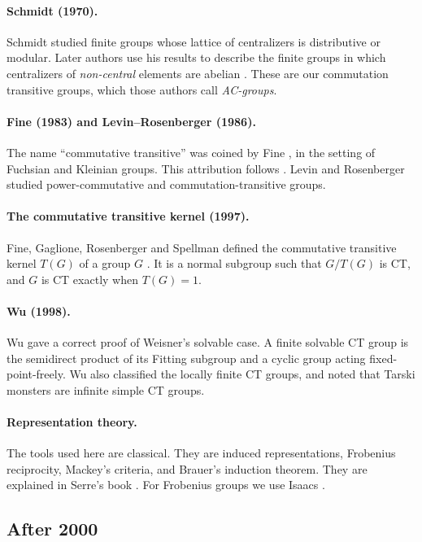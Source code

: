 \documentclass[12pt,letterpaper]{article}
\numberwithin{equation}{section}
\theoremstyle{plain}
\theoremstyle{definition}
\begin{document}
\paragraph{Schmidt (1970).} Schmidt \cite{Sc70} studied finite groups whose
lattice of centralizers is distributive or modular. Later authors use his
results to describe the finite groups in which centralizers of
\emph{non-central} elements are abelian
\cite{GM23}. These are our commutation transitive groups, which those
authors call \emph{AC-groups}.

\paragraph{Fine (1983) and Levin--Rosenberger (1986).} The name
``commutative transitive'' was coined by Fine \cite{Fi83}, in the setting of
Fuchsian and Kleinian groups. This attribution follows \cite{FGRS15}. Levin
and Rosenberger \cite{LR86} studied power-commutative and
commutation-transitive groups.

\paragraph{The commutative transitive kernel (1997).} Fine, Gaglione,
Rosenberger and Spellman defined the commutative transitive kernel $T(G)$ of
a group $G$ \cite{FGRS97}. It is a normal subgroup such that $G/T(G)$ is CT,
and $G$ is CT exactly when $T(G)=1$.

\paragraph{Wu (1998).} Wu \cite{Wu98} gave a correct proof of Weisner's
solvable case. A finite solvable CT group is the semidirect product of its
Fitting subgroup and a cyclic group acting fixed-point-freely. Wu also
classified the locally finite CT groups, and noted that Tarski monsters are
infinite simple CT groups.

\paragraph{Representation theory.} The tools used here are classical. They
are induced representations, Frobenius reciprocity, Mackey's criteria, and
Brauer's induction theorem. They are explained in Serre's book \cite{Se77}.
For Frobenius groups we use Isaacs \cite{Is76}.

\subsection{After 2000}
\end{document}
